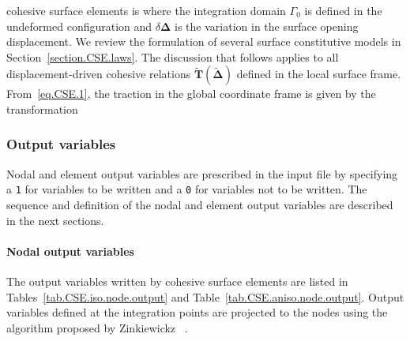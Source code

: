 cohesive surface elements is
where the integration domain $\Gamma_{0}$ is defined in the 
undeformed configuration and $\delta \boldsymbol{\Delta}$ is the 
variation in the surface opening displacement. We review the
formulation of several surface constitutive models in 
Section~\ref{section.CSE.laws}. The discussion that follows
applies to all displacement-driven cohesive relations
$\tilde{\mathbf{T}}(\tilde{\boldsymbol{\Delta}})$
defined in the local surface frame.
From~\eqref{eq.CSE.1}, the traction in the global coordinate frame
is given by the transformation

\subsubsection{Output variables}
Nodal and element output variables are prescribed in the input file 
by specifying a \texttt{1} for variables to be written and a \texttt{0}
for variables not to be written. The sequence and definition of the 
nodal and element output variables are described in the next sections.

\paragraph{Nodal output variables}
The output variables written by cohesive surface elements are listed 
in Tables~\ref{tab.CSE.iso.node.output} and 
Table~\ref{tab.CSE.aniso.node.output}.
Output variables defined at the integration points are projected to 
the nodes using the algorithm proposed by Zinkiewickz \etal~\cite{Zinkiewickz}.

